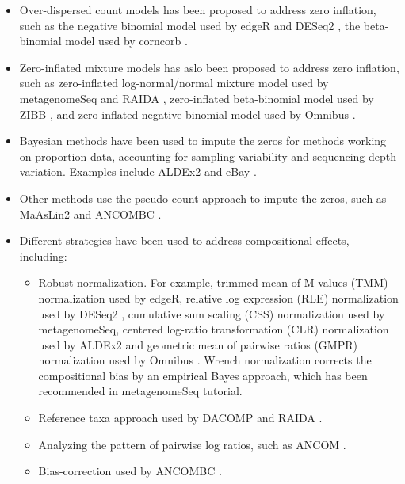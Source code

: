 \documentclass[
]{book}
\providecommand{\tightlist}{%
  \setlength{\itemsep}{0pt}\setlength{\parskip}{0pt}}
\begin{document}
\begin{itemize}
\item
  Over-dispersed count models has been proposed to address zero inflation, such as the negative binomial model used by edgeR \citep{Chen2016} and DESeq2 \citep{Love2014}, the beta-binomial model used by corncorb \citep{Martin2021}.
\item
  Zero-inflated mixture models has aslo been proposed to address zero inflation, such as zero-inflated log-normal/normal mixture model used by metagenomeSeq \citep{Paulson2017} and RAIDA \citep{Sohn2015}, zero-inflated beta-binomial model used by ZIBB \citep{ZIBB2018}, and zero-inflated negative binomial model used by Omnibus \citep{Omnibus2018}.
\item
  Bayesian methods have been used to impute the zeros for methods working on proportion data, accounting for sampling variability and sequencing depth variation. Examples include ALDEx2 \citep{Gloor2016} and eBay \citep{Liu2020}.
\item
  Other methods use the pseudo-count approach to impute the zeros, such as MaAsLin2 \citep{Mallick2020} and ANCOMBC \citep{ancombc2020}.
\item
  Different strategies have been used to address compositional effects, including:

  \begin{itemize}
  \tightlist
  \item
    Robust normalization. For example, trimmed mean of M-values (TMM) normalization used by edgeR, relative log expression (RLE) normalization used by DESeq2 \citep{Love2014}, cumulative sum scaling (CSS) normalization used by metagenomeSeq, centered log-ratio transformation (CLR) normalization used by ALDEx2 \citep{Gloor2016} and geometric mean of pairwise ratios (GMPR) normalization used by Omnibus \citep{Omnibus2018}. Wrench normalization \citep{Kumar2018} corrects the compositional bias by an empirical Bayes approach, which has been recommended in metagenomeSeq \citep{Paulson2017} tutorial.
  \item
    Reference taxa approach used by DACOMP \citep{Brill2019} and RAIDA \citep{Sohn2015}.
  \item
    Analyzing the pattern of pairwise log ratios, such as ANCOM \citep{Mandal2015}.
  \item
    Bias-correction used by ANCOMBC \citep{ancombc2020}.
  \end{itemize}
\end{itemize}
\end{document}
